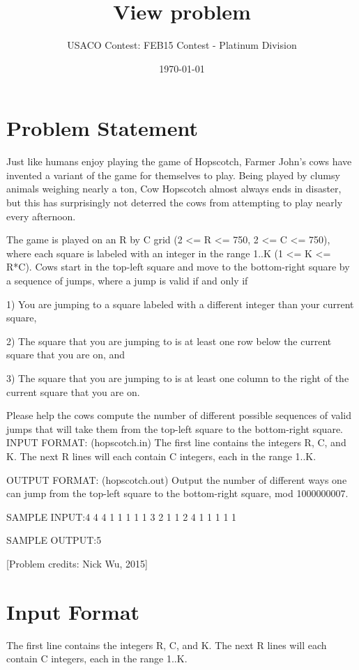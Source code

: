 \documentclass[12pt]{article}
\title{View problem}
\author{USACO Contest: FEB15 Contest - Platinum Division}
\date{\today}
\begin{document}
\maketitle

\section*{Problem Statement}

Just like humans enjoy playing the game of Hopscotch, Farmer John's cows have invented a variant of the game for themselves to play.  Being played by clumsy animals weighing nearly a ton, Cow Hopscotch almost always ends in disaster, but this has surprisingly not deterred the cows from attempting to play nearly every afternoon.

The game is played on an R by C grid (2 <= R <= 750, 2 <= C <= 750), where each square is labeled with an integer in the range 1..K (1 <= K <= R*C).  Cows start in the top-left square and move to the bottom-right square by a sequence of jumps, where a jump is valid if and only if

1) You are jumping to a square labeled with a different integer than your current square,

2) The square that you are jumping to is at least one row below the current square that you are on, and

3) The square that you are jumping to is at least one column to the right of the current square that you are on.

Please help the cows compute the number of different possible sequences of valid jumps that will take them from the top-left square to the bottom-right square.
INPUT FORMAT: (hopscotch.in)
The first line contains the integers R, C, and K.  
The next R lines will each contain C integers, each in the range 1..K.

OUTPUT FORMAT: (hopscotch.out)
Output the number of different ways one can jump from the top-left square to the bottom-right square, mod 1000000007.

SAMPLE INPUT:4 4 4
1 1 1 1
1 3 2 1
1 2 4 1
1 1 1 1

SAMPLE OUTPUT:5


[Problem credits: Nick Wu, 2015]



\section*{Input Format}
The first line contains the integers R, C, and K.  
The next R lines will each contain C integers, each in the range 1..K.
\end{document}
